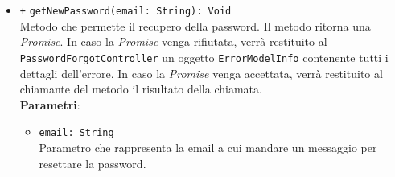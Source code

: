 \begin{itemize}
\begin{itemize}
		\item \texttt{+} \texttt{getNewPassword(email: String): Void}  \\Metodo che permette il recupero della password. Il metodo ritorna una \textit{Promise}. In caso la \textit{Promise} venga rifiutata, verrà restituito al \texttt{PasswordForgotController} un oggetto \texttt{ErrorModelInfo} contenente tutti i dettagli dell'errore. In caso la \textit{Promise} venga accettata, verrà restituito al chiamante del metodo il risultato della chiamata. \\
			\textbf{Parametri}:
			\begin{itemize}
				\item \texttt{email: String} \\ Parametro che rappresenta la email a cui mandare un messaggio per resettare la password.
			\end{itemize}
	\end{itemize}
\end{itemize}